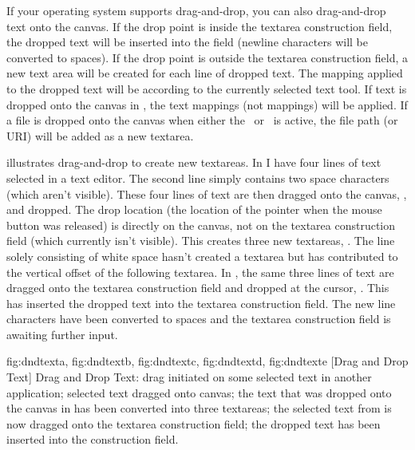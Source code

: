 If your operating system supports \gls{drag-and-drop}, you can also
\gls{drag-and-drop} text onto the \gls{canvas}. If the drop point is
inside the \gls{textarea} construction field, the dropped text will
be inserted into the field (newline characters will be converted to
spaces). If the drop point is outside the \gls{textarea}
construction field, a new text area will be created for each line of
dropped text. The mapping applied to the dropped text will be
according to the currently selected text tool.  If text is dropped
onto the \gls{canvas} in \selectmode, the text mappings (not
 mappings) will be applied. If a file is dropped onto
the \gls{canvas} when either the \texttool\ or \mathstool\ is
active, the file path (or URI) will be added as a new
\gls{textarea}.

 illustrates \gls{drag-and-drop} to create new
\glspl{textarea}.
In  I have four lines of
text selected in a text editor. The second line simply contains two
space characters (which aren't visible). These four lines of text
are then dragged onto the \gls{canvas},
, and dropped. The drop location (the
location of the pointer when the mouse button was released) is
directly on the canvas, not on the \gls{textarea} construction field (which
currently isn't visible). This creates three new \glspl*{textarea},
.
The line solely consisting of white space hasn't created a 
\gls{textarea} but has contributed to the vertical offset of the following
\gls{textarea}. In , the same three lines of
text are dragged onto the \gls{textarea} construction field and dropped
at the cursor, . This has inserted the
dropped text into the \gls{textarea} construction field. The new line
characters have been converted to spaces and the \gls{textarea}
construction field is awaiting further input.

{
 {fig:dndtexta}{}{},
 {fig:dndtextb}{}{},
 {fig:dndtextc}{}{},
 {fig:dndtextd}{}{},
 {fig:dndtexte}{}{}
}
[Drag and Drop Text]
{Drag and Drop Text:  drag initiated on some
selected text in another application; 
selected text dragged onto canvas;  the text
that was dropped onto the canvas in  has
been converted into three \glspl{textarea}; 
the selected text from  is now dragged onto
the \gls{textarea} construction field;  the
dropped text has been inserted into the construction field.}

